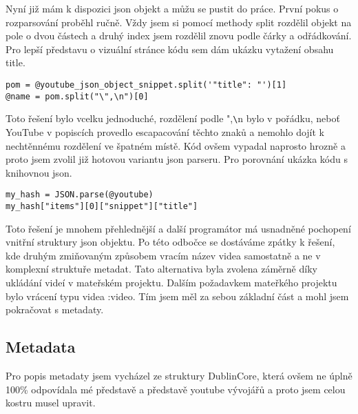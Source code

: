 \par Nyní již mám k dispozici json objekt a můžu se pustit do práce. První pokus o rozparsování proběhl ručně. Vždy jsem si pomocí methody split rozdělil objekt na pole o dvou částech a druhý index jsem rozdělil znovu podle čárky a odřádkování. Pro lepší představu o vizuální stránce kódu sem dám ukázku vytažení obsahu title.
\begin{verbatim}
pom = @youtube_json_object_snippet.split('"title": "')[1]
@name = pom.split("\",\n")[0]
\end{verbatim}
\par Toto řešení bylo vcelku jednoduché, rozdělení podle ",\verb|\|n bylo v pořádku, neboť YouTube v popiscích provedlo escapacování těchto znaků a nemohlo dojít k nechtěnnému rozdělení ve špatném místě. Kód ovšem vypadal naprosto hrozně a proto jsem zvolil již hotovou variantu json parseru. Pro porovnání ukázka kódu s knihovnou json.
\begin{verbatim}
my_hash = JSON.parse(@youtube)
my_hash["items"][0]["snippet"]["title"]
\end{verbatim}

\par Toto řešení je mnohem přehlednější a další programátor má usnadněné pochopení vnitřní struktury json objektu. Po této odbočce se dostáváme zpátky k řešení, kde druhým zmiňovaným způsobem vracím název videa samostatně a ne v komplexní struktuře metadat. Tato alternativa byla zvolena záměrně díky ukládání videí v mateřském projektu. Dalším požadavkem mateřkého projektu bylo vrácení typu videa :video. Tím jsem měl za sebou základní část a mohl jsem pokračovat s metadaty.


\subsection{Metadata}

\par Pro popis metadaty jsem vycházel ze struktury DublinCore, která ovšem ne úplně 100\% odpovídala mé představě a představě youtube vývojářů a proto jsem celou kostru musel upravit. 

